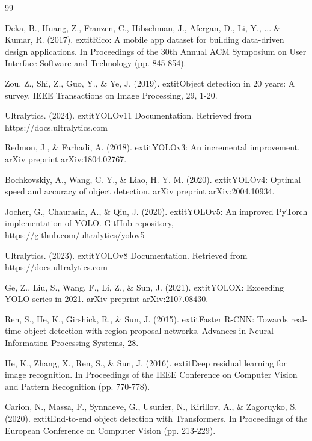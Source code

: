 \documentclass[11pt,a4paper]{report}
\begin{document}
\newpage
\renewcommand{\bibname}{References}
\begin{thebibliography}{99}

Deka, B., Huang, Z., Franzen, C., Hibschman, J., Afergan, D., Li, Y., ... \& Kumar, R. (2017).
	extit{Rico: A mobile app dataset for building data-driven design applications}.
In Proceedings of the 30th Annual ACM Symposium on User Interface Software and Technology (pp. 845-854).

Zou, Z., Shi, Z., Guo, Y., \& Ye, J. (2019).
	extit{Object detection in 20 years: A survey}.
IEEE Transactions on Image Processing, 29, 1-20.

Ultralytics. (2024).
	extit{YOLOv11 Documentation}.
Retrieved from https://docs.ultralytics.com

Redmon, J., \& Farhadi, A. (2018).
	extit{YOLOv3: An incremental improvement}.
arXiv preprint arXiv:1804.02767.

Bochkovskiy, A., Wang, C. Y., \& Liao, H. Y. M. (2020).
	extit{YOLOv4: Optimal speed and accuracy of object detection}.
arXiv preprint arXiv:2004.10934.

Jocher, G., Chaurasia, A., \& Qiu, J. (2020).
	extit{YOLOv5: An improved PyTorch implementation of YOLO}.
GitHub repository, https://github.com/ultralytics/yolov5

Ultralytics. (2023).
	extit{YOLOv8 Documentation}.
Retrieved from https://docs.ultralytics.com

Ge, Z., Liu, S., Wang, F., Li, Z., \& Sun, J. (2021).
	extit{YOLOX: Exceeding YOLO series in 2021}.
arXiv preprint arXiv:2107.08430.

Ren, S., He, K., Girshick, R., \& Sun, J. (2015).
	extit{Faster R-CNN: Towards real-time object detection with region proposal networks}.
Advances in Neural Information Processing Systems, 28.

He, K., Zhang, X., Ren, S., \& Sun, J. (2016).
	extit{Deep residual learning for image recognition}.
In Proceedings of the IEEE Conference on Computer Vision and Pattern Recognition (pp. 770-778).

Carion, N., Massa, F., Synnaeve, G., Usunier, N., Kirillov, A., \& Zagoruyko, S. (2020).
	extit{End-to-end object detection with Transformers}.
In Proceedings of the European Conference on Computer Vision (pp. 213-229).


\end{thebibliography}
\end{document}
